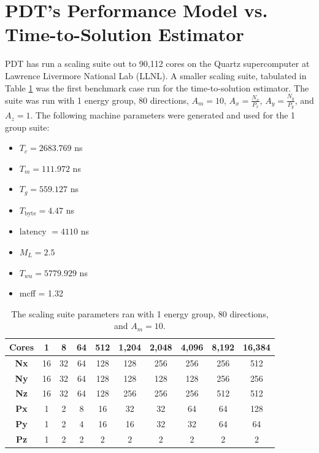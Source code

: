 \section{PDT's Performance Model vs. Time-to-Solution Estimator}

PDT has run a scaling suite out to 90,112 cores on the Quartz supercomputer \cite{quartz} at Lawrence Livermore National Lab (LLNL).
A smaller scaling suite, tabulated in Table \ref{scaling_suite} was the first benchmark case run for the time-to-solution estimator.
The suite was run with 1 energy group, 80 directions, $A_m = 10$, $A_x=\frac{N_x}{P_x}$, $A_y=\frac{N_y}{P_y}$, and $A_z = 1$.
The following machine parameters were generated and used for the 1 group suite:
\begin{itemize}
  \item $T_c = 2683.769$ ns
  \item $T_m = 111.972$ ns
  \item $T_g = 559.127$ ns
  \item $T_\text{byte} = 4.47$ ns
  \item $\text{latency }= 4110$ ns
  \item $M_L = 2.5$
  \item $T_{wu} = 5779.929$ ns
  \item mcff = 1.32
\end{itemize}

\begin{table}[H]
  \centering
  \begin{tabular}{c|c|c|c|c|c|c|c|c|c}
    \textbf{Cores} & 1 & 8 & 64 & 512 & 1,204 & 2,048 & 4,096 & 8,192 & 16,384 \\ \hline
    \textbf{Nx} & 16 & 32 & 64 & 128 & 128 & 256 & 256 & 256 & 512 \\ \hline
    \textbf{Ny} & 16 & 32 & 64 & 128 & 128 & 128 & 128 & 256 & 256 \\ \hline
    \textbf{Nz} & 16 & 32 & 64 & 128 & 256 & 256 & 256 & 512 & 512 \\ \hline
    \textbf{Px} & 1  & 2  & 8  & 16  & 32  & 32  & 64  & 64  & 128 \\ \hline
    \textbf{Py} & 1  & 2  & 4  & 16  & 16  & 32  & 32  & 64  & 64  \\ \hline
    \textbf{Pz} & 1  & 2  & 2  & 2   & 2   & 2   & 2   & 2   & 2   \\
  \end{tabular}
  \caption{The scaling suite parameters ran with 1 energy group, 80 directions, and $A_m = 10$.}
  \label{scaling_suite}
\end{table}

